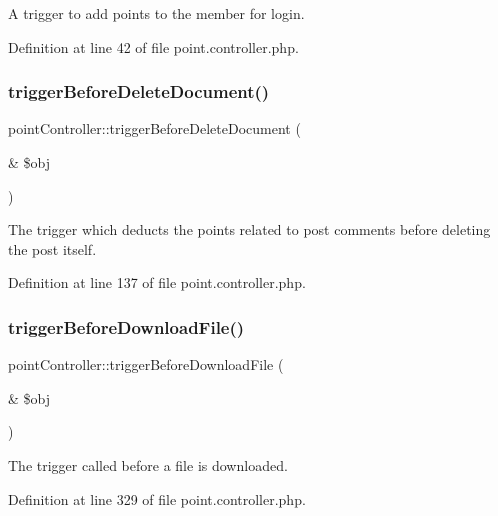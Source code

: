 A trigger to add points to the member for login. 



Definition at line 42 of file point.\+controller.\+php.

\mbox{\label{classpointController_a6773e89c36c2ad9086f1e4628149123c}} 
\subsubsection{\texorpdfstring{trigger\+Before\+Delete\+Document()}{triggerBeforeDeleteDocument()}}
{\footnotesize\ttfamily point\+Controller\+::trigger\+Before\+Delete\+Document (\begin{DoxyParamCaption}\item[{\&}]{\$obj }\end{DoxyParamCaption})}



The trigger which deducts the points related to post comments before deleting the post itself. 



Definition at line 137 of file point.\+controller.\+php.

\mbox{\label{classpointController_afa504365e28861dc15a905c46e1f29e3}} 
\subsubsection{\texorpdfstring{trigger\+Before\+Download\+File()}{triggerBeforeDownloadFile()}}
{\footnotesize\ttfamily point\+Controller\+::trigger\+Before\+Download\+File (\begin{DoxyParamCaption}\item[{\&}]{\$obj }\end{DoxyParamCaption})}



The trigger called before a file is downloaded. 



Definition at line 329 of file point.\+controller.\+php.

